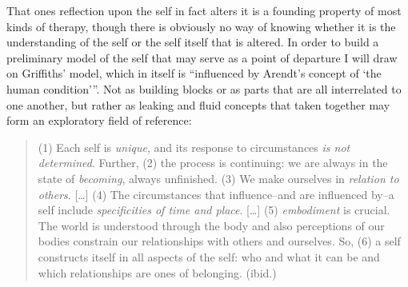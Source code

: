 \documentclass[a4paper]{article}
\begin{document}
That ones reflection upon the self in fact alters it is a founding property of most kinds of therapy, though there is obviously no way of knowing whether it is the understanding of the self or the self itself that is altered. In order to build a preliminary model of the self that may serve as a point of departure I will draw on Griffiths' model, which in itself is ``influenced by Arendt's concept of `the human condition'''. Not as building blocks or as parts that are all interrelated to one another, but rather as leaking and fluid concepts that taken together may form an exploratory field of reference:

\begin{quote}
  (1) Each self is \emph{unique}, and its response to circumstances \emph{is not determined}. Further, (2) the process is continuing: we are always in the state of \emph{becoming}, always unfinished. (3) We make ourselves in \emph{relation to others}. [\ldots] (4) The circumstances that influence--and are influenced by--a self include \emph{specificities of time and place}. [\ldots] (5) \emph{embodiment} is crucial. The world is understood through the body and also perceptions of our bodies constrain our relationships with others and ourselves. So, (6) a self constructs itself in all aspects of the self: who and what it can be and which relationships are ones of belonging. (ibid.)
\end{quote}
\end{document}
